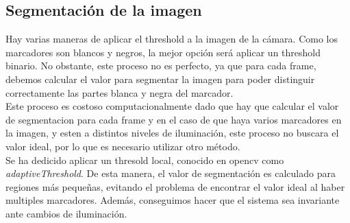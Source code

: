 \documentclass{article}
\begin{document}
\subsection{Segmentación de la imagen}
Hay varias maneras de aplicar el threshold a la imagen de la cámara. Como los marcadores son blancos y negros, la mejor opción será aplicar un threshold binario. No obstante, este proceso no es perfecto, ya que para cada frame, debemos calcular el valor para segmentar la imagen para poder distinguir correctamente las partes blanca y negra del marcador.\\
Este proceso es costoso computacionalmente dado que hay que calcular el valor de segmentacion para cada frame y en el caso de que haya varios marcadores en la imagen, y esten a distintos niveles de iluminación, este proceso no buscara el valor ideal, por lo que es necesario utilizar otro método.\\

Se ha dedicido aplicar un thresold local, conocido en opencv como \textit{adaptiveThreshold}. De esta manera, el valor de segmentación es calculado para regiones más pequeñas, evitando el problema de encontrar el valor ideal al haber multiples marcadores. Además, conseguimos hacer que el sistema sea invariante ante cambios de iluminación.\\
\end{document}

